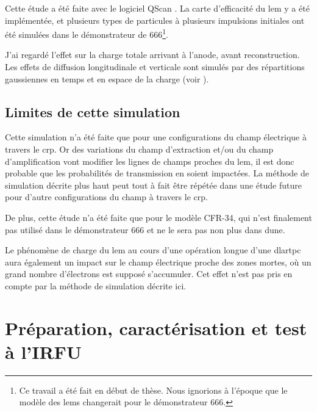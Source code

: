            Cette étude a été faite avec le logiciel QScan \cite{qscan}. La carte d'efficacité du \gls{lem} y a été implémentée, et plusieurs types de particules à plusieurs impulsions initiales ont été simulées dans le démonstrateur de 666\footnote{Ce travail a été fait en début de thèse. Nous ignorions à l'époque que le modèle des \glspl{lem} changerait pour le démonstrateur 666.}.
            
            J'ai regardé l'effet sur la charge totale arrivant à l'anode, avant reconstruction. Les effets de diffusion longitudinale et verticale sont simulés par des répartitions gaussiennes en temps et en espace de la charge (voir \cite{diffusion}).
            
        
        \subsection{Limites de cette simulation}
        
            Cette simulation n'a été faite que pour une configurations du champ électrique à travers le \gls{crp}. Or des variations du champ d'extraction et/ou du champ d'amplification vont modifier les lignes de champs proches du \gls{lem}, il est donc probable que les probabilités de transmission en soient impactées. La méthode de simulation décrite plus haut peut tout à fait être répétée dans une étude future pour d'autre configurations du champ à travers le \gls{crp}.
            
            De plus, cette étude n'a été faite que pour le modèle CFR-34, qui n'est finalement pas utilisé dans le démonstrateur 666 et ne le sera pas non plus dans \gls{dune}.
            
            Le phénomène de charge du \gls{lem} au cours d'une opération longue d'une \gls{dlartpc} aura également un impact sur le champ électrique proche des zones mortes, où un grand nombre d'électrons est supposé s'accumuler. Cet effet n'est pas pris en compte par la méthode de simulation décrite ici.
        
    \section{Préparation, caractérisation et test à l'IRFU}
    
